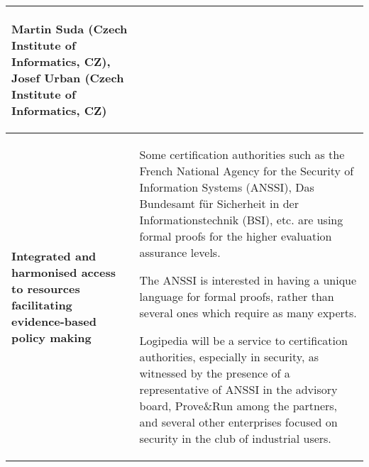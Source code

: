 \begin{longtable}{|p{}|p{}|}
\begin{shaded}
Martin Suda (Czech Institute of Informatics, CZ),
Josef Urban (Czech Institute of Informatics, CZ)
\end{shaded}
\\
\hline {\bf Integrated and harmonised access to resources facilitating
  evidence-based policy making} & Some certification authorities such
as the French National Agency for the Security of Information Systems
(ANSSI), Das Bundesamt für Sicherheit in der Informationstechnik (BSI), etc.
are using formal proofs for the higher evaluation assurance levels. 

The ANSSI is interested in having a unique language for formal proofs,
rather than several ones which require as many experts.

Logipedia will be a service to certification authorities, especially
in security, as witnessed by the presence of a representative of ANSSI
in the advisory board, Prove\&Run among the partners, and several
other enterprises focused on security in the club of industrial users.


\end{longtable}
